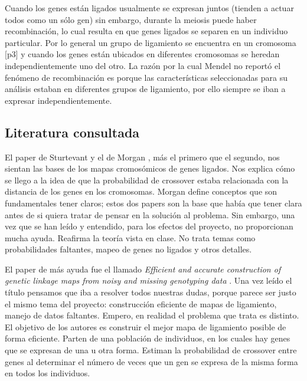 \documentclass{article}
\begin{document}
		Cuando los genes están ligados usualmente se expresan juntos (tienden a actuar todos como un sólo gen) sin embargo, durante la meiosis puede haber recombinación, lo cual resulta en que genes ligados se separen en un individuo particular. Por lo general un grupo de ligamiento se encuentra en un cromosoma \cite{wu2007efficient}[p3] y cuando los genes están ubicados en diferentes cromosomas se heredan independientemente uno del otro. La razón por la cual Mendel no reportó el fenómeno de recombinación es porque las características seleccionadas para su análisis estaban en diferentes grupos de ligamiento, por ello siempre se iban a expresar independientemente. 
	
	
	\subsection{Literatura consultada}
	El paper de Sturtevant \cite{sturtevant1913linear} y el de Morgan \cite{morgan1910sex}, más el primero que el segundo, nos sientan las bases de los mapas cromosómicos de genes ligados. Nos explica cómo se llego a la idea de que la probabilidad de crossover estaba relacionada con la distancia de los genes en los cromosomas.  Morgan define conceptos que son fundamentales tener claros; estos dos papers son la base que había que tener clara antes de si quiera tratar de pensar en la solución al problema. Sin embargo, una vez que se han leído y entendido, para los efectos del proyecto, no proporcionan mucha ayuda. Reafirma la teoría vista en clase. No trata temas como probabilidades faltantes, mapeo de genes no ligados y otros detalles.

	El paper de más ayuda fue el llamado \textit{Efficient and accurate construction of genetic linkage maps from noisy and missing genotyping data} \cite{wu2007efficient}. Una vez leído el título pensamos que iba a resolver todos nuestras dudas, porque parece ser justo el mismo tema del proyecto: construcción eficiente de mapas de ligamiento, manejo de datos faltantes. Empero, en realidad el problema que trata es distinto. El objetivo de los autores es construir el mejor mapa de ligamiento posible de forma eficiente. Parten de una población de individuos, en los cuales hay genes que se expresan de una u otra forma. Estiman la probabilidad de crossover entre genes al determinar el número de veces que un gen se expresa de la misma forma en todos los individuos.
\end{document}
